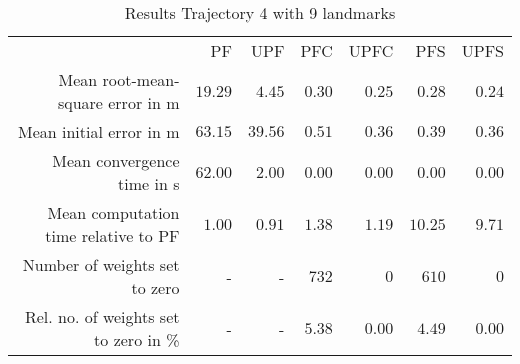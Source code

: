 \begin{table}
\centering
\begin{tabular}{rrrrrrr}
 & PF & UPF & PFC & UPFC & PFS & UPFS \\
Mean root-mean-square error in m & $19.29$ & $4.45$ & $0.30$ & $0.25$ & $0.28$ & $0.24$ \\
Mean initial error in m & $63.15$ & $39.56$ & $0.51$ & $0.36$ & $0.39$ & $0.36$ \\
Mean convergence time in s & $62.00$ & $2.00$ & $0.00$ & $0.00$ & $0.00$ & $0.00$ \\
Mean computation time relative to PF & $1.00$ & $0.91$ & $1.38$ & $1.19$ & $10.25$ & $9.71$ \\
Number of weights set to zero & - & - & $732$ & $0$ & $610$ & $0$ \\
Rel. no. of weights set to zero in \% & - & - & $5.38$ & $0.00$ & $4.49$ & $0.00$ \\
\end{tabular}
\caption{Results Trajectory 4 with 9 landmarks}
\label{table:landmark_positions_4}
\end{table}
